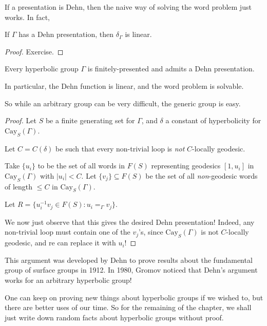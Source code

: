 \documentclass[a4paper]{article}
\newcommand\Cay{\mathrm{Cay}}
\begin{document}
If a presentation is Dehn, then the naive way of solving the word problem just works. In fact,

\begin{lemma}
  If $\Gamma$ has a Dehn presentation, then $\delta_\Gamma$ is linear.
\end{lemma}

\begin{proof}
  Exercise.
\end{proof}

\begin{thm}
  Every hyperbolic group $\Gamma$ is finitely-presented and admits a Dehn presentation.

  In particular, the Dehn function is linear, and the word problem is solvable.
\end{thm}
So while an arbitrary group can be very difficult, the generic group is easy.

\begin{proof}
  Let $S$ be a finite generating set for $\Gamma$, and $\delta$ a constant of hyperbolicity for $\Cay_S(\Gamma)$.

  Let $C = C(\delta)$ be such that every non-trivial loop is \emph{not} $C$-locally geodesic.

  Take $\{u_i\}$ to be the set of all words in $F(S)$ representing geodesics $[1, u_i]$ in $\Cay_S(\Gamma)$ with $|u_i| < C$. Let $\{v_j\} \subseteq F(S)$ be the set of all \emph{non}-geodesic words of length $\leq C$ in $\Cay_S(\Gamma)$.

  Let $R = \{u_i^{-1} v_j \in F(S) : u_i =_\Gamma v_j\}$.

  We now just observe that this gives the desired Dehn presentation! Indeed, any non-trivial loop must contain one of the $v_j$'s, since $\Cay_S(\Gamma)$ is not $C$-locally geodesic, and re can replace it with $u_i$!
\end{proof}
This argument was developed by Dehn to prove results about the fundamental group of surface groups in 1912. In 1980, Gromov noticed that Dehn's argument works for an arbitrary hyperbolic group! %

One can keep on proving new things about hyperbolic groups if we wished to, but there are better uses of our time. So for the remaining of the chapter, we shall just write down random facts about hyperbolic groups without proof.
\end{document}
